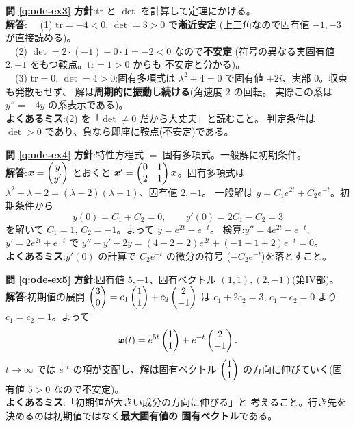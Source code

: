 \bigskip
\noindent\textbf{問 \ref{q:ode-ex3}}\quad
\textbf{方針}:$\mathrm{tr}$ と $\det$ を計算して定理にかける。\\
\textbf{解答}:
　(1) $\mathrm{tr} = -4 < 0$, $\det = 3 > 0$ で\textbf{漸近安定}
(上三角なので固有値 $-1, -3$ が直接読める)。\\
　(2) $\det = 2 \cdot (-1) - 0 \cdot 1 = -2 < 0$ なので\textbf{不安定}
(符号の異なる実固有値 $2, -1$ をもつ鞍点。$\mathrm{tr} = 1 > 0$ からも
不安定と分かる)。\\
　(3) $\mathrm{tr} = 0$, $\det = 4 > 0$:固有多項式は
$\lambda^2 + 4 = 0$ で固有値 $\pm 2i$、実部 $0$。収束も発散もせず、
解は\textbf{周期的に振動し続ける}(角速度 $2$ の回転。
実際この系は $y'' = -4y$ の系表示である)。\\
\textbf{よくあるミス}:(2) を「$\det \neq 0$ だから大丈夫」と読むこと。
判定条件は $\det > 0$ であり、負なら即座に鞍点(不安定)である。

\bigskip
\noindent\textbf{問 \ref{q:ode-ex4}}\quad
\textbf{方針}:特性方程式 $=$ 固有多項式。一般解に初期条件。\\
\textbf{解答}:$\bm{x} = \begin{pmatrix}y \\ y'\end{pmatrix}$ とおくと
$\bm{x}' = \begin{pmatrix}0 & 1 \\ 2 & 1\end{pmatrix}\bm{x}$。固有多項式は
$\lambda^2 - \lambda - 2 = (\lambda - 2)(\lambda + 1)$、固有値 $2, -1$。
一般解は $y = C_1 e^{2t} + C_2 e^{-t}$。初期条件から
\[
y(0) = C_1 + C_2 = 0, \qquad y'(0) = 2C_1 - C_2 = 3
\]
を解いて $C_1 = 1$, $C_2 = -1$。よって $y = e^{2t} - e^{-t}$。
検算:$y'' = 4e^{2t} - e^{-t}$, $y' = 2e^{2t} + e^{-t}$ で
$y'' - y' - 2y = (4 - 2 - 2)e^{2t} + (-1 - 1 + 2)e^{-t} = 0$。\\
\textbf{よくあるミス}:$y'(0)$ の計算で $C_2 e^{-t}$ の微分の符号
($-C_2 e^{-t}$)を落とすこと。

\bigskip
\noindent\textbf{問 \ref{q:ode-ex5}}\quad
\textbf{方針}:固有値 $5, -1$、固有ベクトル $(1,1), (2,-1)$(第IV部)。\\
\textbf{解答}:初期値の展開
$\begin{pmatrix}3 \\ 0\end{pmatrix} = c_1\begin{pmatrix}1 \\ 1\end{pmatrix} + c_2\begin{pmatrix}2 \\ -1\end{pmatrix}$ は
$c_1 + 2c_2 = 3$, $c_1 - c_2 = 0$ より $c_1 = c_2 = 1$。よって
\[
\bm{x}(t) = e^{5t}\begin{pmatrix}1 \\ 1\end{pmatrix} + e^{-t}\begin{pmatrix}2 \\ -1\end{pmatrix}.
\]
$t \to \infty$ では $e^{5t}$ の項が支配し、解は固有ベクトル
$\begin{pmatrix}1 \\ 1\end{pmatrix}$ の方向に伸びていく(固有値 $5 > 0$ なので不安定)。\\
\textbf{よくあるミス}:「初期値が大きい成分の方向に伸びる」と
考えること。行き先を決めるのは初期値ではなく\textbf{最大固有値の
固有ベクトル}である。

